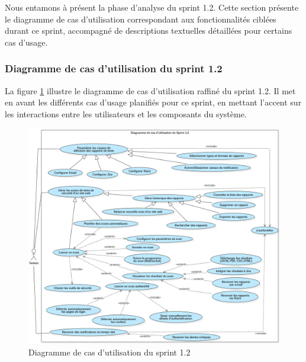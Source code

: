Nous entamons à présent la phase d’analyse du sprint 1.2. Cette section présente le diagramme de cas d’utilisation correspondant aux fonctionnalités ciblées durant ce sprint, accompagné de descriptions textuelles détaillées pour certains cas d’usage.

\subsubsection{Diagramme de cas d’utilisation du sprint 1.2}

La figure \ref{fig:caseS2} illustre le diagramme de cas d’utilisation raffiné du sprint 1.2. Il met en avant les différents cas d’usage planifiés pour ce sprint, en mettant l’accent sur les interactions entre les utilisateurs et les composants du système.

\begin{figure}[H]
\centering
\includegraphics[width=\linewidth]{chapitres/ch3Sp1/section/sprint2/img/LastUseCaseSprint1.2.png}
\caption{Diagramme de cas d’utilisation du sprint 1.2}
\label{fig:caseS2}
\end{figure}
\vspace{-0.6cm}
